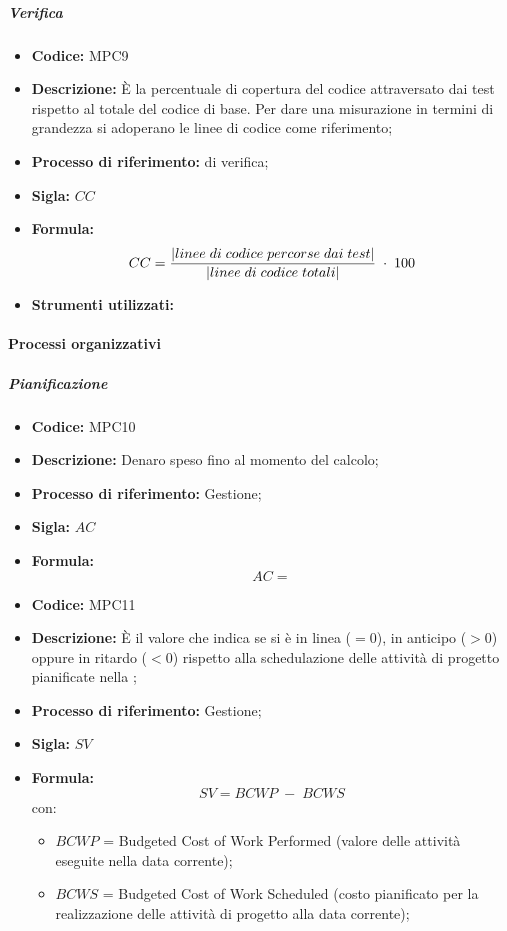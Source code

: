 \subparagraph{Verifica}
\begin{itemize}
	\item \textbf{Codice:} MPC9
	\item \textbf{Descrizione:} È la percentuale di copertura del codice attraversato dai test rispetto al totale del codice di base. Per dare una misurazione in termini di grandezza si adoperano le linee di codice come riferimento;
	\item \textbf{Processo di riferimento:}  di verifica;
	\item \textbf{Sigla:} $CC$
	\item \textbf{Formula:} $$CC = {|linee \; di \; codice \; percorse \; dai  \; test| \over |linee \; di \; codice \; totali|} \; \cdot \; 100$$
	\item \textbf{Strumenti utilizzati:}
\end{itemize}
    \paragraph{Processi organizzativi}

\subparagraph{Pianificazione}

    \begin{itemize}
        \item \textbf{Codice:} MPC10
        \item \textbf{Descrizione:} Denaro speso fino al momento del calcolo;
        \item \textbf{Processo di riferimento:} Gestione;
        \item \textbf{Sigla:} $AC$
        \item \textbf{Formula:} $$AC = {}$$
    \end{itemize}

    \begin{itemize}
        \item \textbf{Codice:} MPC11
        \item \textbf{Descrizione:} È il valore che indica se si è in linea ($=0$), in anticipo ($>0$) oppure in ritardo ($<0$) rispetto alla schedulazione delle attività di progetto pianificate nella ;
        \item \textbf{Processo di riferimento:} Gestione;
        \item \textbf{Sigla:} $SV$
        \item \textbf{Formula:} $$SV = {BCWP \; - \; BCWS}$$
        con:
        \begin{itemize}
            \item $BCWP$ = Budgeted Cost of Work Performed (valore delle attività eseguite nella data corrente);
            \item $BCWS$ = Budgeted Cost of Work Scheduled (costo pianificato per la realizzazione delle attività di progetto alla data corrente);
        \end{itemize}
    \end{itemize}

